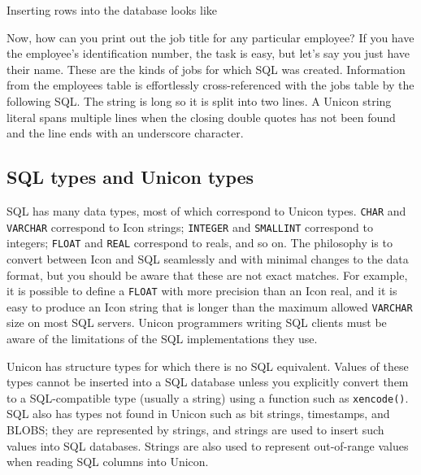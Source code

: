 \noindent
Inserting rows into the database looks like


Now, how can you print out the job title for any particular employee? If
you have the employee's identification number, the
task is easy, but let's say you just have their name.
These are the kinds of jobs for which SQL was created. Information from
the employees table is effortlessly cross-referenced with the jobs
table by the following SQL. The string is long so it is split into
two lines. A Unicon string literal spans multiple lines when the
closing double quotes has not been found and the line ends with an
underscore character.


\subsection*{SQL types and Unicon types}

SQL has many data types, most of which correspond to Unicon types.
\texttt{CHAR} and \texttt{VARCHAR} correspond to Icon
strings; \texttt{INTEGER} and \texttt{SMALLINT} correspond to integers;
\texttt{FLOAT} and \texttt{REAL} correspond to reals, and so on. The
philosophy is to convert between Icon and SQL seamlessly and with
minimal changes to the data format, but you should be aware that these
are not exact matches. For example, it is possible to define a
\texttt{FLOAT} with more precision than an Icon real, and it is easy to
produce an Icon string that is longer than the maximum allowed
\texttt{VARCHAR} size on most SQL servers. Unicon programmers writing
SQL clients must be aware of the limitations of the SQL implementations
they use.

Unicon has structure types for which there is no SQL equivalent. Values
of these types cannot be inserted into a SQL database unless you
explicitly convert them to a SQL-compatible type (usually a string)
using a function such as \texttt{xencode()}.
SQL also has types not found in Unicon such as bit
strings, timestamps, and BLOBS; they are represented
by strings, and strings are used to insert such values into SQL
databases. Strings are also used to represent out-of-range values when
reading SQL columns into Unicon.

